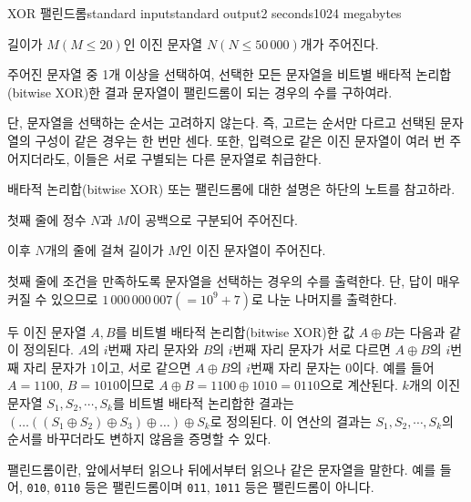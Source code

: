 \begin{problem}{XOR 팰린드롬}{standard input}{standard output}{2 seconds}{1024 megabytes}

길이가 $M(M \le 20)$인 이진 문자열 $N(N \le 50\, 000)$개가 주어진다.

주어진 문자열 중 1개 이상을 선택하여, 선택한 모든 문자열을 비트별 배타적 논리합(bitwise XOR)한 결과 문자열이 팰린드롬이 되는 경우의 수를 구하여라.

단, 문자열을 선택하는 순서는 고려하지 않는다. 즉, 고르는 순서만 다르고 선택된 문자열의 구성이 같은 경우는 한 번만 센다. 또한, 입력으로 같은 이진 문자열이 여러 번 주어지더라도, 이들은 서로 구별되는 다른 문자열로 취급한다.

배타적 논리합(bitwise XOR) 또는 팰린드롬에 대한 설명은 하단의 노트를 참고하라.

\InputFile
첫째 줄에 정수 $N$과 $M$이 공백으로 구분되어 주어진다.

이후 $N$개의 줄에 걸쳐 길이가 $M$인 이진 문자열이 주어진다.

\OutputFile
첫째 줄에 조건을 만족하도록 문자열을 선택하는 경우의 수를 출력한다. 단, 답이 매우 커질 수 있으므로 $1\, 000\, 000\, 007(=10^9+7)$로 나눈 나머지를 출력한다.

\Examples

\begin{example}
%
%
\end{example}

\Note
두 이진 문자열 $A, B$를 비트별 배타적 논리합(bitwise XOR)한 값 $A \oplus B$는 다음과 같이 정의된다.
$A$의 $i$번째 자리 문자와 $B$의 $i$번째 자리 문자가 서로 다르면 $A \oplus B$의 $i$번째 자리 문자가 $1$이고, 서로 같으면 $A \oplus B$의 $i$번째 자리 문자는 $0$이다.
예를 들어 $A=\text{1100}$, $B=\text{1010}$이므로 $A \oplus B = \text{1100} \oplus \text{1010} = \text{0110}$으로 계산된다.
$k$개의 이진 문자열 $S_1, S_2, \cdots, S_k$를 비트별 배타적 논리합한 결과는 $(\dots((S_1 \oplus S_2) \oplus S_3) \oplus \dots) \oplus S_k$로 정의된다. 이 연산의 결과는 $S_1, S_2, \cdots, S_k$의 순서를 바꾸더라도 변하지 않음을 증명할 수 있다.

팰린드롬이란, 앞에서부터 읽으나 뒤에서부터 읽으나 같은 문자열을 말한다. 예를 들어, \texttt{010}, \texttt{0110} 등은 팰린드롬이며 \texttt{011}, \texttt{1011} 등은 팰린드롬이 아니다.

\end{problem}

